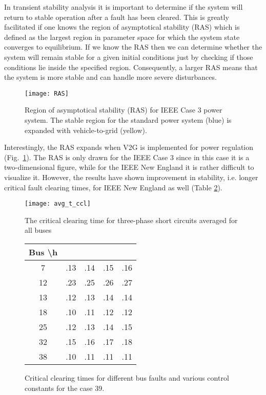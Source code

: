 \documentclass[final,12pt]{elsarticle}
\begin{document}
In transient stability analysis it is important to determine if the system will
return to stable operation after a fault has been cleared. This is greatly
facilitated if one knows the region of asymptotical stability (RAS) which is
defined as the largest region in parameter space for which the system state
converges to equilibrium. If we know the RAS then we can determine whether the
system will remain stable for a given initial conditions just by checking if
those conditions lie inside the specified region.
Consequently, a larger RAS means that the system is more stable and can handle
more severe disturbances.

\begin{figure}[!htb]
\texttt{[image: RAS]}
\caption{Region of asymptotical stability (RAS) for IEEE Case 3 power system. The stable region for the standard power system (blue) is expanded with vehicle-to-grid (yellow).}
\label{fig:RAS}
\end{figure}

Interestingly, the RAS expands when V2G is implemented for power regulation
(Fig.~\ref{fig:RAS}). The RAS is only drawn for the IEEE Case 3 since in this
case it is a two-dimensional figure, while for the IEEE New England it is rather
difficult to visualize it. However, the results have shown improvement in
stability, i.e. longer critical fault clearing times, for IEEE New England as
well (Table \ref{tab:psse_t_ccl}).
\renewcommand{\arraystretch}{1.15}

\begin{figure}[!htb]
\CenterFloatBoxes
\begin{floatrow}
\ffigbox
  {\texttt{[image: avg\_t\_ccl]}}
  {\caption{The critical clearing time  for three-phase short circuits averaged for all buses}\label{fig:psse_t_ccl}}
\killfloatstyle
\ttabbox
  {\begin{tabular}{ | c ||  c |  c |  c |  c | } 
 \hline 
Bus \textbackslash h &  &  &  &   \\ \hline 
7 & .13 & .14 & .15 & .16    \\ \hline 
12 & .23 & .25 & .26 & .27   \\ \hline 
13 & .12 & .13 & .14 & .14    \\ \hline 
18 & .10 & .11 & .12 & .12    \\ \hline 
25 & .12 & .13 & .14 & .15    \\ \hline 
32 & .15 & .16 & .17 & .18    \\ \hline 
38 & .10 & .11 & .11 & .11    \\ \hline 
\end{tabular}
  }
  {\caption{Critical clearing times for different bus faults and various control constants for the case 39.}\label{tab:psse_t_ccl}}
\end{floatrow}
\end{figure}
\end{document}
